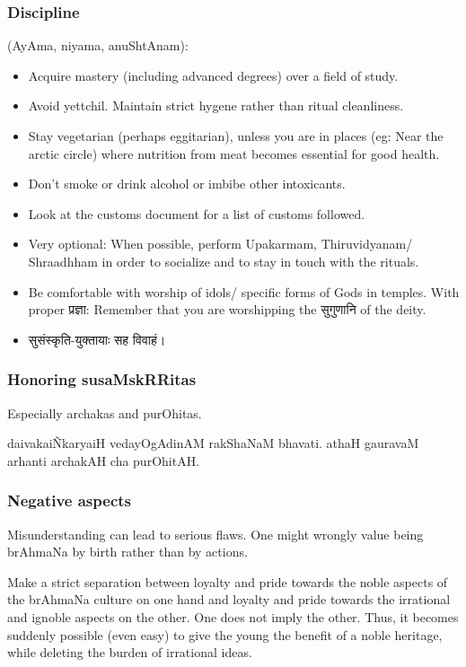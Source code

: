 \documentclass[oneside, article]{memoir}
\begin{document}
\subsubsection{Discipline}
(AyAma, niyama, anuShtAnam):
\begin{itemize}
\item Acquire mastery (including advanced degrees) over a field of study.
\item Avoid yettchil. Maintain strict hygene rather than ritual cleanliness.
\item Stay vegetarian (perhaps eggitarian), unless you are in places (eg: Near the arctic circle) where nutrition from meat becomes essential for good health.
\item Don't smoke or drink alcohol or imbibe other intoxicants.
\item Look at the customs document for a list of customs followed.
\item Very optional: When possible, perform Upakarmam, Thiruvidyanam/ Shraadhham in order to socialize and to stay in touch with the rituals.
\item Be comfortable with worship of idols/ specific forms of Gods in temples. With proper प्रज्ञा: Remember that you are worshipping the सुगुणानि of the deity.
\item सुसंस्कृति-युक्तायाः सह विवाहं।
\end{itemize}

\subsubsection{Honoring susaMskRRitas}
Especially archakas and purOhitas.

daivakai\~NkaryaiH vedayOgAdinAM rakShaNaM bhavati. athaH gauravaM arhanti archakAH cha purOhitAH.

\subsubsection{Negative aspects}
Misunderstanding can lead to serious flaws. One might wrongly value being brAhmaNa by birth rather than by actions.

Make a strict separation between loyalty and pride towards the noble aspects of the brAhmaNa  culture on one hand and loyalty and pride towards the irrational and ignoble aspects on the other. One does not imply the other. Thus, it becomes suddenly possible (even easy) to give the young the benefit of a noble heritage, while deleting the burden of irrational ideas.
\end{document}
